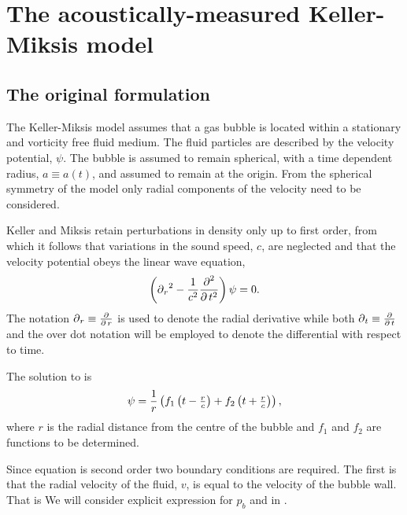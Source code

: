 \section{The acoustically-measured Keller-Miksis model}
\subsection{The original formulation}\label{sec:KMoriginal}
The Keller-Miksis model\cite{Keller1980}  assumes that a gas bubble is located within a stationary and vorticity free fluid medium.
The fluid particles are described by the velocity potential, $\psi$.
The  bubble is assumed to remain spherical, with a  time dependent radius, $a \equiv a(t)$,
and assumed to remain at the origin.
From the spherical symmetry of the model only radial components of the velocity need to be considered. 

Keller and Miksis retain perturbations in density only up to first order, from which it follows that variations in the sound speed, $c$, are neglected
and that the velocity potential obeys the linear wave equation,
\begin{align}
\label{eqn:WaveEqn}
\left( {\operatorname{\partial}_r}^2 - \frac{1}{c^2}\frac{\operatorname{\partial}^2}{\operatorname{\partial} t^2} \right) \psi = 0.
\end{align}
The notation ${\operatorname{\partial}_r} \equiv\frac{\operatorname{\partial}}{\operatorname{\partial} r}$ is used to denote the radial derivative
while both  $\operatorname{\partial}_t \equiv \frac{\operatorname{\partial}}{\operatorname{\partial} t}$ and the over dot notation will be employed to denote the differential with respect to time.

The solution to  is
\begin{align}
  \label{eqn:Ansatz}
  \psi = \frac{1}{r}\left( f_1\left( t-\tfrac{r}{c} \right) + f_2\left( t+\tfrac{r}{c} \right) \right),
\end{align}
where $r$ is the radial distance from the centre of the bubble
and $f_1$ and $f_2$ are functions to be determined.

Since equation  is second order two boundary conditions are required.
The first is that the radial velocity of the fluid, $v$, is equal to the velocity of the bubble wall.
That is 
We will consider explicit expression for $p_b$  and in .

